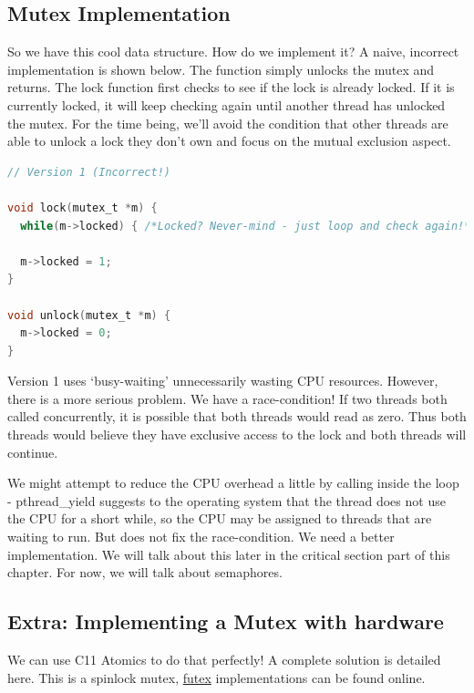 \subsection{Mutex Implementation}

So we have this cool data structure.
How do we implement it?
A naive, incorrect implementation is shown below.
The  function simply unlocks the mutex and returns.
The lock function first checks to see if the lock is already locked.
If it is currently locked, it will keep checking again until another thread has unlocked the mutex.
For the time being, we'll avoid the condition that other threads are able to unlock a lock they don't own and focus on the mutual exclusion aspect.

\begin{lstlisting}[language=C]
// Version 1 (Incorrect!)

void lock(mutex_t *m) {
  while(m->locked) { /*Locked? Never-mind - just loop and check again!*/ }

  m->locked = 1;
}

void unlock(mutex_t *m) {
  m->locked = 0;
}
\end{lstlisting}

Version 1 uses `busy-waiting' unnecessarily wasting CPU resources.
However, there is a more serious problem.
We have a race-condition!
If two threads both called  concurrently, it is possible that both threads would read  as zero.
Thus both threads would believe they have exclusive access to the lock and both threads will continue.

We might attempt to reduce the CPU overhead a little by calling  inside the loop - pthread\_yield suggests to the operating system that the thread does not use the CPU for a short while, so the CPU may be assigned to threads that are waiting to run.
But does not fix the race-condition.
We need a better implementation.
We will talk about this later in the critical section part of this chapter.
For now, we will talk about semaphores.

\subsection{Extra: Implementing a Mutex with hardware}

We can use C11 Atomics to do that perfectly!
A complete solution is detailed here.
This is a spinlock mutex, \href{https://locklessinc.com/articles/mutex_cv_futex/}{futex} implementations can be found online.

